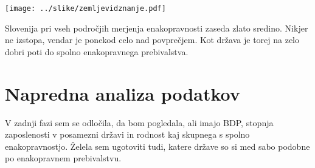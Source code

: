 \documentclass[11pt,a4paper]{article}
\begin{document}
\texttt{[image: ../slike/zemljevidznanje.pdf]}

Slovenija pri vseh področjih merjenja enakopravnosti zaseda zlato sredino. Nikjer ne izstopa, vendar je ponekod celo nad povprečjem. Kot država je torej na zelo dobri poti do spolno enakopravnega prebivalstva.



\section{Napredna analiza podatkov}
V zadnji fazi sem se odločila, da bom pogledala, ali imajo BDP, stopnja zaposlenosti v posamezni državi in rodnost kaj skupnega s spolno enakopravnostjo. Želela sem ugotoviti tudi, katere države so si med sabo podobne po enakopravnem prebivalstvu.



\end{document}
